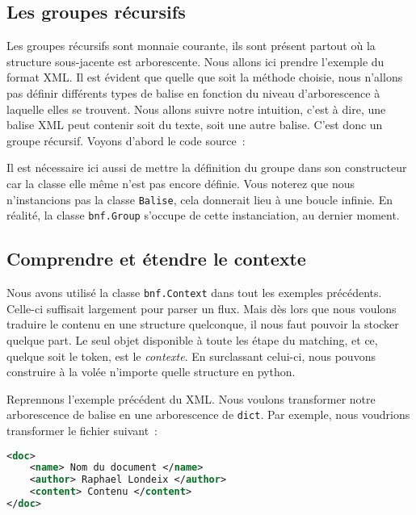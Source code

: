 \documentclass[a4paper]{article}
\newcommand{\fixed}[1]{\texttt{#1}}
\begin{document}
        \subsection{Les groupes récursifs}
            Les groupes récursifs sont monnaie courante, ils sont présent
            partout où la structure sous-jacente est arborescente.
            Nous allons ici prendre l'exemple du format XML. Il est
            évident que quelle que soit la méthode choisie, nous n'allons pas
            définir différents types de balise en fonction du niveau d'arborescence
            à laquelle elles se trouvent. Nous allons suivre notre intuition,
            c'est à dire, une balise XML peut contenir soit du texte, soit
            une autre balise. C'est donc un groupe récursif.
            Voyons d'abord le code source~:

            Il est nécessaire ici aussi de mettre la définition du groupe dans
            son constructeur car la classe elle même n'est pas encore définie.
            Vous noterez que nous n'instancions pas la classe \fixed{Balise},
            cela donnerait lieu à une boucle infinie. En réalité, la classe
            \fixed{bnf.Group} s'occupe de cette instanciation, au dernier moment.

        \subsection{Comprendre et étendre le contexte}
            Nous avons utilisé la classe \fixed{bnf.Context} dans tout les
            exemples précédents. Celle-ci suffisait largement pour parser
            un flux. Mais dès lors que nous voulons traduire le contenu en
            une structure quelconque, il nous faut pouvoir la stocker quelque
            part. Le seul objet disponible à toute les étape du matching, et
            ce, quelque soit le token, est le \emph{contexte}. En surclassant
            celui-ci, nous pouvons construire à la volée n'importe quelle
            structure en python.

            Reprennons l'exemple précédent du XML. Nous voulons transformer notre
            arborescence de balise en une arborescence de \fixed{dict}.
            Par exemple, nous voudrions transformer le fichier suivant~:
            \lstset{caption=Un fichier xml simple}
            \begin{lstlisting}[language=xml]
<doc>
    <name> Nom du document </name>
    <author> Raphael Londeix </author>
    <content> Contenu </content>
</doc>
            \end{lstlisting}
\end{document}
